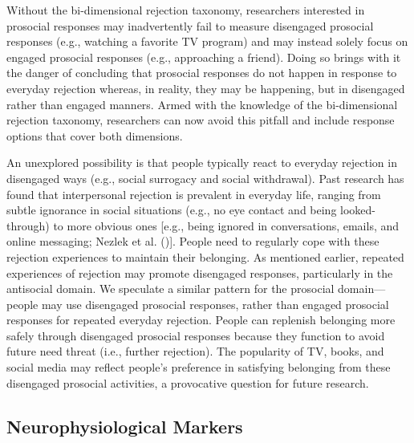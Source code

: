 \documentclass[
]{udthesis}
\begin{document}
Without the bi-dimensional rejection taxonomy, researchers interested in
prosocial responses may inadvertently fail to measure disengaged
prosocial responses (e.g., watching a favorite TV program) and may
instead solely focus on engaged prosocial responses (e.g., approaching a
friend). Doing so brings with it the danger of concluding that prosocial
responses do not happen in response to everyday rejection whereas, in
reality, they may be happening, but in disengaged rather than engaged
manners. Armed with the knowledge of the bi-dimensional rejection
taxonomy, researchers can now avoid this pitfall and include response
options that cover both dimensions.

An unexplored possibility is that people typically react to everyday
rejection in disengaged ways (e.g., social surrogacy and social
withdrawal). Past research has found that interpersonal rejection is
prevalent in everyday life, ranging from subtle ignorance in social
situations (e.g., no eye contact and being looked-through) to more
obvious ones {[}e.g., being ignored in conversations, emails, and online
messaging; Nezlek et al. (){]}. People need to regularly
cope with these rejection experiences to maintain their belonging. As
mentioned earlier, repeated experiences of rejection may promote
disengaged responses, particularly in the antisocial domain. We
speculate a similar pattern for the prosocial domain---people may use
disengaged prosocial responses, rather than engaged prosocial responses
for repeated everyday rejection. People can replenish belonging more
safely through disengaged prosocial responses because they function to
avoid future need threat (i.e., further rejection). The popularity of
TV, books, and social media may reflect people's preference in
satisfying belonging from these disengaged prosocial activities, a
provocative question for future research.

\subsection{Neurophysiological Markers}\label{neurophysiological-markers}
\end{document}
